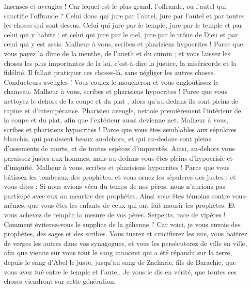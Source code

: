 \begin{multicols}{2}
Insensés et aveugles ! Car lequel est le plus grand, l’offrande, ou l'autel qui sanctifie l’offrande ?
Celui donc qui jure par l'autel, jure par l'autel et par toutes les choses qui sont dessus.
Celui qui jure par le temple, jure par le temple et par celui qui y habite ;
et celui qui jure par le ciel, jure par le trône de Dieu et par celui qui y est assis.
Malheur à vous, scribes et pharisiens hypocrites ! Parce que vous payez la dîme de la menthe, de l'aneth et du cumin ; et vous laissez les choses les plus importantes de la loi, c'est-à-dire la justice, la miséricorde et la fidélité. Il fallait pratiquer ces choses-là, sans négliger les autres choses.
Conducteurs aveugles ! Vous coulez le moucheron et vous engloutissez le chameau.
Malheur à vous, scribes et pharisiens hypocrites ! Parce que vous nettoyez le dehors de la coupe et du plat ; alors qu’au-dedans ils sont pleins de rapine et d'intempérance.
Pharisien aveugle, nettoie premièrement l’intérieur de la coupe et du plat, afin que l’extérieur aussi devienne net.
Malheur à vous, scribes et pharisiens hypocrites ! Parce que vous êtes semblables aux sépulcres blanchis, qui paraissent beaux au-dehors, et qui au-dedans sont pleins d'ossements de morts, et de toutes espèces d’impuretés.
Ainsi, au-dehors vous paraissez justes aux hommes, mais au-dedans vous êtes pleins d'hypocrisie et d'iniquité.
Malheur à vous, scribes et pharisiens hypocrites ! Parce que vous bâtissez les tombeaux des prophètes, et vous ornez les sépulcres des justes ;
et vous dites : Si nous avions vécu du temps de nos pères, nous n'aurions pas participé avec eux au meurtre des prophètes.
Ainsi vous êtes témoins contre vous-mêmes, que vous êtes les enfants de ceux qui ont fait mourir les prophètes.
Et vous achevez de remplir la mesure de vos pères.
Serpents, race de vipères ! Comment éviterez-vous le supplice de la géhenne ?
Car voici, je vous envoie des prophètes, des sages et des scribes. Vous tuerez et crucifierez les uns, vous battrez de verges les autres dans vos synagogues, et vous les persécuterez de ville en ville,
afin que vienne sur vous tout le sang innocent qui a été répandu sur la terre, depuis le sang d'Abel le juste, jusqu’au sang de Zacharie, fils de Barachie, que vous avez tué entre le temple et l'autel.
Je vous le dis en vérité, que toutes ces choses viendront sur cette génération.

\end{multicols}

